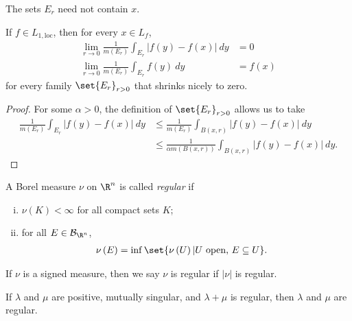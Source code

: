 \documentclass[10pt]{mypackage}
\begin{document}
 \begin{remark}
   The sets $E_r$ need not contain $x$.
 \end{remark}
 \begin{theorem}
   If $f\in L_{1,\text{loc}}$, then for every $x\in L_f$,
   \begin{align*}
     \lim_{r\rightarrow 0} \frac{1}{m\left( E_r \right)} \int_{E_r}^{} \left\vert f(y)-f(x) \right\vert\:dy &= 0\\
     \lim_{r\rightarrow 0} \frac{1}{m\left( E_r \right)} \int_{E_r}^{} f(y)\:dy &= f(x)
   \end{align*}
   for every family $\set{E_r}_{r > 0}$ that shrinks nicely to zero.
 \end{theorem}
 \begin{proof}
   For some $\alpha > 0$, the definition of $\set{E_r}_{r > 0}$ allows us to take
   \begin{align*}
     \frac{1}{m\left( E_r \right)} \int_{E_r}^{} \left\vert f(y)-f(x) \right\vert\:dy &\leq \frac{1}{m\left( E_r \right)} \int_{B\left( x,r \right)}^{} \left\vert f(y)-f(x) \right\vert\:dy\\
                                                                                      &\leq \frac{1}{\alpha m\left( B\left( x,r \right) \right)} \int_{B\left( x,r \right)}^{} \left\vert f(y)-f(x) \right\vert\:dy.
   \end{align*}
 \end{proof}
 \begin{definition}
   A Borel measure $\nu$ on $\R^n$ is called \textit{regular} if
   \begin{enumerate}[(i)]
     \item $\nu\left( K \right) < \infty$ for all compact sets $K$;
     \item for all $E\in \mathcal{B}_{\R^n}$,
       \begin{align*}
         \nu\left( E \right) &= \inf\set{\nu\left( U \right) | U\text{ open, }E\subseteq U}.
       \end{align*}
   \end{enumerate}
   If $\nu$ is a signed measure, then we say $\nu$ is regular if $\left\vert \nu \right\vert$ is regular.
 \end{definition}
 \begin{proposition}
   If $\lambda$ and $\mu$ are positive, mutually singular, and $\lambda + \mu$ is regular, then $\lambda$ and $\mu$ are regular.
 \end{proposition}
\end{document}
